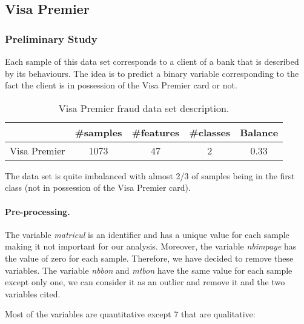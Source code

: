 
\subsection{Visa Premier}


\subsubsection{Preliminary Study}

Each sample of this data set corresponds to a client of a bank that is described by its behaviours. The idea is to predict a binary variable corresponding to the fact the client is in possession of the Visa Premier card or not.

\begin{table}[H] 
    \centering
    \begin{tabular}{|c|c|c|c|c|}
        \hline
        & \textbf{\#samples} & \textbf{\#features} & \textbf{\#classes} & \textbf{Balance} \\
        \hline
        Visa Premier & 1073 & 47 & 2 & 0.33 \\
        \hline
    \end{tabular}
    \captionsetup{width=0.8\textwidth}
    \caption{Visa Premier fraud data set description.}
    \label{tab:visa_desc}
\end{table}

The data set is quite imbalanced with almost 2/3 of samples being in the first class (not in possession of the Visa Premier card).



\paragraph{Pre-processing.}

The variable \textit{matricul} is an identifier and has a unique value for each sample making it not important for our analysis. Moreover, the variable \textit{nbimpaye} has the value of zero for each sample. Therefore, we have decided to remove these variables. The variable \textit{nbbon} and \textit{mtbon} have the same value for each sample except only one, we can consider it as an outlier and remove it and the two variables cited.

Most of the variables are quantitative except 7 that are qualitative:

